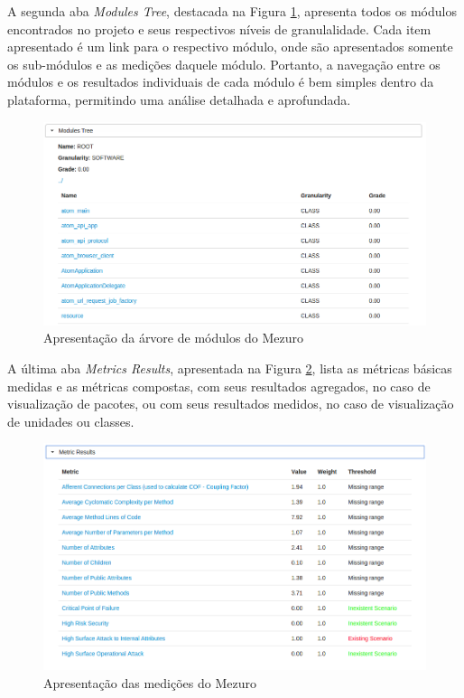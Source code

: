 A segunda aba \emph{Modules Tree}, destacada na Figura \ref{modules_info}, apresenta todos os módulos encontrados no projeto e seus respectivos níveis de granulalidade. Cada item apresentado é um link para o respectivo módulo, onde são apresentados somente os sub-módulos e as medições daquele módulo. Portanto, a navegação entre os módulos e os resultados individuais de cada módulo é bem simples dentro da plataforma, permitindo uma análise detalhada e aprofundada.

\begin{figure}[H]
	\centering
		\includegraphics[scale=0.5]{figuras/modules_info}
		\caption{Apresentação da árvore de módulos do Mezuro}
		\label{modules_info}
\end{figure}

A última aba \emph{Metrics Results}, apresentada na Figura \ref{metrics_info}, lista as métricas básicas medidas e as métricas compostas, com seus resultados agregados, no caso de visualização de pacotes, ou com seus resultados medidos, no caso de visualização de unidades ou classes. 

\begin{figure}[H]
	\centering
		\includegraphics[scale=0.5]{figuras/metrics_info}
		\caption{Apresentação das medições do Mezuro}
		\label{metrics_info}
\end{figure}

